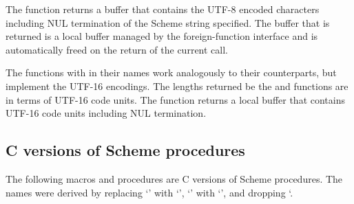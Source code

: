 The  function returns a
buffer that contains the UTF-8 encoded characters including NUL
termination of the Scheme string specified.  The buffer that is
returned is a local buffer managed by the foreign-function interface
and is automatically freed on the return of the current call.

The functions with  in their names work analogously to
their  counterparts, but implement the UTF-16 encodings.
The lengths returned be the  and
 functions are in terms of UTF-16 code units.
The  function returns a local buffer that contains
UTF-16 code units including NUL termination.

\subsection{C versions of Scheme procedures}

The following macros and procedures are C versions of Scheme procedures.
The names were derived by replacing `\code{-}' with `\code{\_}',
 `' with `', and dropping `\code{!}.

